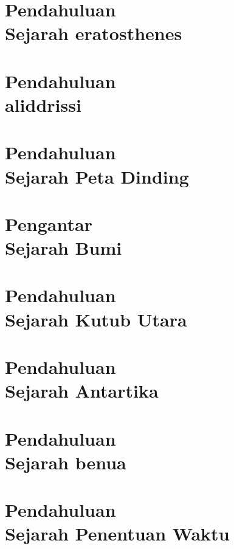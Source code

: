 \documentclass{WileySix}
\begin{document}
\chapter[Sejarah eratosthenes]
{Pendahuluan\\ Sejarah eratosthenes}



\chapter[Sejarah aliddrissi]
{Pendahuluan\\ aliddrissi}


\chapter[Sejarah Peta Dinding]
{Pendahuluan\\ Sejarah Peta Dinding}


\chapter[Sejarah Bumi]
{Pengantar\\ Sejarah Bumi}


\chapter[Sejarah Kutub Utara]
{Pendahuluan\\ Sejarah Kutub Utara}


\chapter[Tentang Kutub Selatan]
{Pendahuluan\\ Sejarah Antartika}


\chapter[Sejarah Benua]
{Pendahuluan\\ Sejarah benua}


\chapter[Sejarah Penentuan Waktu]
{Pendahuluan\\ Sejarah Penentuan Waktu}

\end{document}
